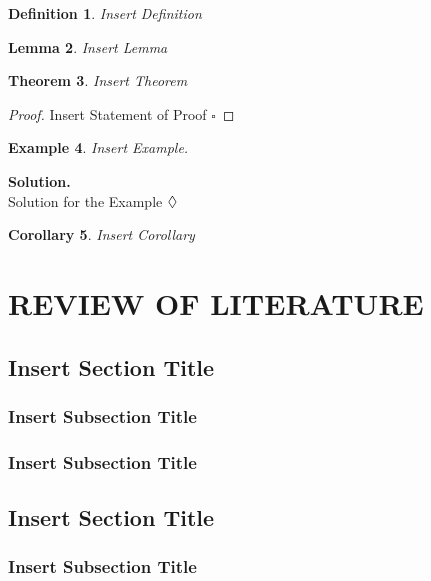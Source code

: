 \documentclass[12pt,a4paper,oneside]{book}
\theoremstyle{plain}
\newtheorem{thm}{Theorem}[chapter]
\newtheorem{lem}[thm]{Lemma}
\newtheorem{cor}[thm]{Corollary}
\newtheorem{ex}[thm]{Example}
\newtheorem{de}[thm]{Definition}
\numberwithin{equation}{chapter} \DeclareMathOperator{\Var}{Var}
\newcommand*{\QEDA}{\hfill\ensuremath{\large{\lozenge}}}
\newcommand*{\QEDAa}{\hfill\ensuremath{\square}}
\begin{document}
\begin{de}\label{def1}
	Insert Definition
\end{de}

\vspace{1cm}

\begin{lem}\label{lem1}
	Insert Lemma
\end{lem}

\vspace{1cm}

\begin{thm}\label{thm1}
	Insert Theorem
\end{thm}

\noindent\begin{proof}
	Insert Statement of Proof
	\QEDAa
\end{proof}

\vspace{1cm}

\begin{ex}\label{ex1}
	Insert Example.
\end{ex}
\noindent\textbf{Solution.}\\
Solution for the Example \QEDA

\vspace{1cm}

\begin{cor}
	Insert Corollary
\end{cor}


\chapter{REVIEW OF LITERATURE}
\section{Insert Section Title}\label{Sec3.1}
\subsection{Insert Subsection Title}\label{sub3.1.1}
\subsection{Insert Subsection Title}\label{sub3.1.2}

\section{Insert Section Title}\label{Sec3.2}
\subsection{Insert Subsection Title}\label{sub3.2.1}
\end{document}
